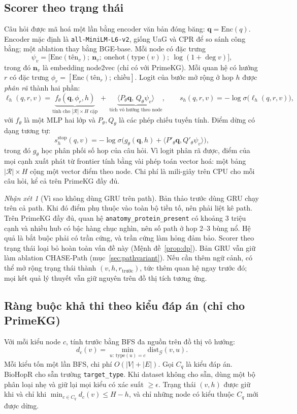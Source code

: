 \documentclass[11pt,a4paper]{article}
\theoremstyle{remark}
\newtheorem{remark}{Nhận xét}
\newcommand{\G}{\mathcal{G}}
\newcommand{\method}{\textsc{CHASE}}
\begin{document}
\subsection{Scorer theo trạng thái}\label{sec:scorer}
Câu hỏi được mã hoá một lần bằng encoder văn bản đóng băng: $\mathbf{q}=\mathrm{Enc}(q)$. Encoder mặc định là \texttt{all-MiniLM-L6-v2}, giống UaG và CPR để so sánh công bằng; một ablation thay bằng BGE-base. Mỗi node có đặc trưng
\[
\psi_v=\big[\mathrm{Enc}(\text{tên}_v);\ \mathbf{n}_v;\ \mathrm{onehot}(\mathrm{type}(v));\ \log(1+\deg v)\big],
\]
trong đó $\mathbf{n}_v$ là embedding node2vec (chỉ có với PrimeKG). Mỗi quan hệ có hướng $r$ có đặc trưng $\phi_r=[\mathrm{Enc}(\text{tên}_r);\ \text{chiều}]$. Logit của bước mở rộng ở hop $h$ được \emph{phân rã} thành hai phần:
\begin{equation}
\ell_h(q,r,v)=\underbrace{f_\theta(\mathbf{q},\phi_r,h)}_{\text{tính cho }|\mathcal{R}|\times H\text{ cặp}}\ +\ \underbrace{\langle P_\theta\mathbf{q},\,Q_\theta\psi_v\rangle}_{\text{tích vô hướng theo node}},
\qquad s_h(q,r,v)=-\log\sigma\big(\ell_h(q,r,v)\big),
\end{equation}
với $f_\theta$ là một MLP hai lớp và $P_\theta,Q_\theta$ là các phép chiếu tuyến tính. Điểm dừng có dạng tương tự:
\[
s^{\mathrm{stop}}_h(q,v)=-\log\sigma\big(g_\theta(\mathbf{q},h)+\langle P'_\theta\mathbf{q},Q'_\theta\psi_v\rangle\big),
\]
trong đó $g_\theta$ học phân phối số hop của câu hỏi. Vì logit phân rã được, điểm của mọi cạnh xuất phát từ frontier tính bằng vài phép toán vector hoá: một bảng $|\mathcal{R}|\times H$ cộng một vector điểm theo node. Chi phí là mili-giây trên CPU cho mỗi câu hỏi, kể cả trên PrimeKG đầy đủ.

\begin{remark}[Vì sao không dùng GRU trên path]
Bản thảo trước dùng GRU chạy trên cả path. Khi đó điểm phụ thuộc vào toàn bộ tiền tố, nên phải liệt kê path. Trên PrimeKG đầy đủ, quan hệ \texttt{anatomy\_protein\_present} có khoảng 3 triệu cạnh và nhiều hub có bậc hàng chục nghìn, nên số path ở hop 2--3 bùng nổ. Hệ quả là bắt buộc phải có trần cứng, và trần cứng làm hỏng đảm bảo. Scorer theo trạng thái loại bỏ hoàn toàn vấn đề này (Mệnh đề~\ref{prop:dp}). Bản GRU vẫn giữ làm ablation \method-Path (mục~\ref{sec:pathvariant}). Nếu cần thêm ngữ cảnh, có thể mở rộng trạng thái thành $(v,h,r_{\text{trước}})$, tức thêm quan hệ ngay trước đó; mọi kết quả lý thuyết vẫn giữ nguyên trên đồ thị tích tương ứng.
\end{remark}

\subsection{Ràng buộc khả thi theo kiểu đáp án (chỉ cho PrimeKG)}\label{sec:feas}
Với mỗi kiểu node $c$, tính trước bằng BFS đa nguồn trên đồ thị vô hướng:
\[
d_c(v)=\min_{u:\,\mathrm{type}(u)=c}\mathrm{dist}_\G(v,u).
\]
Mỗi kiểu tốn một lần BFS, chi phí $O(|V|+|E|)$. Gọi $C_q$ là kiểu đáp án. BioHopR cho sẵn trường \texttt{target\_type}. Khi dataset không cho sẵn, dùng một bộ phân loại nhẹ và giữ lại mọi kiểu có xác suất $\ge\epsilon$. Trạng thái $(v,h)$ được giữ khi và chỉ khi $\min_{c\in C_q}d_c(v)\le H-h$, và chỉ những node có kiểu thuộc $C_q$ mới được dừng.
\end{document}
